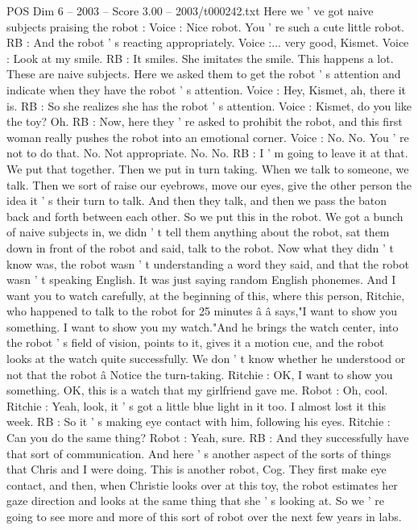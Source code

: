 \begin{textsample}{POS Dim 6 – 2003 – Score 3.00 – 2003/t000242.txt}
Here we ' ve got naive subjects praising the robot : Voice : Nice robot.
You ' re such a cute little robot.
RB : And the robot ' s reacting appropriately.
Voice :... very good, Kismet.
Voice : Look at my smile.
RB : It smiles.
She imitates the smile.
This happens a lot.
These are naive subjects.
Here we asked them to get the robot ' s attention and indicate when they have the robot ' s attention.
Voice : Hey, Kismet, ah, there it is.
RB : So she realizes she has the robot ' s attention.
Voice : Kismet, do you like the toy?
Oh.
RB : Now, here they ' re asked to prohibit the robot, and this first woman really pushes the robot into an emotional corner.
Voice : No.
No.
You ' re not to do that.
No.
Not appropriate.
No.
No.
RB : I ' m going to leave it at that.
We put that together.
Then we put in turn taking.
When we talk to someone, we talk.
Then we sort of raise our eyebrows, move our eyes, give the other person the idea it ' s their turn to talk.
And then they talk, and then we pass the baton back and forth between each other.
So we put this in the robot.
We got a bunch of naive subjects in, we didn ' t tell them anything about the robot, sat them down in front of the robot and said, talk to the robot.
Now what they didn ' t know was, the robot wasn ' t understanding a word they said, and that the robot wasn ' t speaking English.
It was just saying random English phonemes.
And I want you to watch carefully, at the beginning of this, where this person, Ritchie, who happened to talk to the robot for 25 minutes â â says,"I want to show you something.
I want to show you my watch."And he brings the watch center, into the robot ' s field of vision, points to it, gives it a motion cue, and the robot looks at the watch quite successfully.
We don ' t know whether he understood or not that the robot â Notice the turn-taking.
Ritchie : OK, I want to show you something.
OK, this is a watch that my girlfriend gave me.
Robot : Oh, cool.
Ritchie : Yeah, look, it ' s got a little blue light in it too.
I almost lost it this week.
RB : So it ' s making eye contact with him, following his eyes.
Ritchie : Can you do the same thing?
Robot : Yeah, sure.
RB : And they successfully have that sort of communication.
And here ' s another aspect of the sorts of things that Chris and I were doing.
This is another robot, Cog.
They first make eye contact, and then, when Christie looks over at this toy, the robot estimates her gaze direction and looks at the same thing that she ' s looking at.
So we ' re going to see more and more of this sort of robot over the next few years in labs.

\end{textsample}
